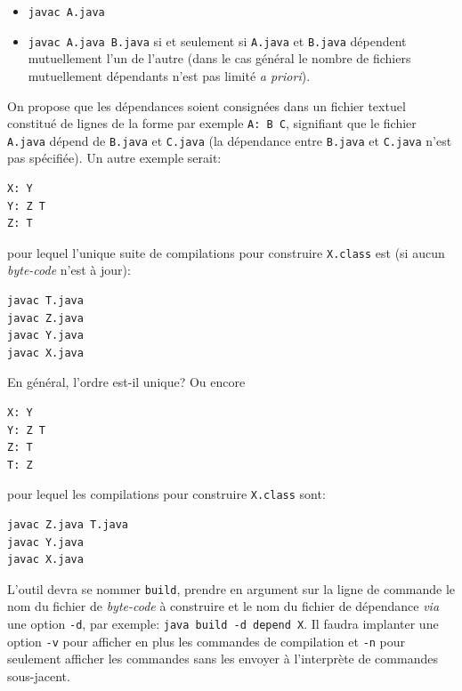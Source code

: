 \documentclass[a4paper,11pt]{article}
\begin{document}
\begin{itemize}

  \item \verb|javac A.java|

  \item \verb|javac A.java B.java| si et seulement si \texttt{A.java}
  et \texttt{B.java} dépendent mutuellement l'un de l'autre (dans le
  cas général le nombre de fichiers mutuellement dépendants n'est pas
  limité \emph{a priori}).

\end{itemize}

\noindent On propose que les dépendances soient consignées dans un
fichier textuel constitué de lignes de la forme par exemple
\verb|A: B C|, signifiant que le fichier \texttt{A.java} dépend de
\texttt{B.java} et \texttt{C.java} (la dépendance entre
\texttt{B.java} et \texttt{C.java} n'est pas spécifiée). Un autre
exemple serait:
\begin{verbatim}
X: Y
Y: Z T
Z: T
\end{verbatim}
pour lequel l'unique suite de compilations pour construire
\texttt{X.class} est (si aucun \emph{byte-code} n'est à jour):
\begin{verbatim}
javac T.java
javac Z.java
javac Y.java
javac X.java
\end{verbatim}
\noindent En général, l'ordre est-il unique? Ou encore
\begin{verbatim}
X: Y
Y: Z T
Z: T
T: Z
\end{verbatim}
pour lequel les compilations pour construire \texttt{X.class} sont:
\begin{verbatim}
javac Z.java T.java
javac Y.java
javac X.java
\end{verbatim}

L'outil devra se nommer \texttt{build}, prendre en argument sur la
ligne de commande le nom du fichier de \emph{byte-code} à construire
et le nom du fichier de dépendance \emph{via} une option \texttt{-d},
par exemple: \texttt{java build~-d~depend~X}. Il faudra implanter une
option \texttt{-v} pour afficher en plus les commandes de compilation
et \texttt{-n} pour seulement afficher les commandes sans les envoyer
à l'interprète de commandes sous-jacent.
\end{document}
